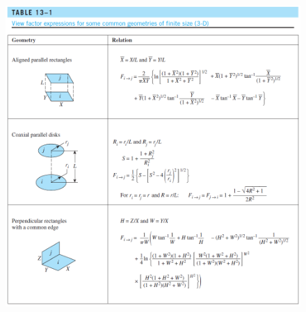 \begin{itemize}
\begin{figure}[H]
        \includegraphics[width=1.0\linewidth]{images/View_factor_table_13_1.png}
    \end{figure}
    

\end{itemize}
